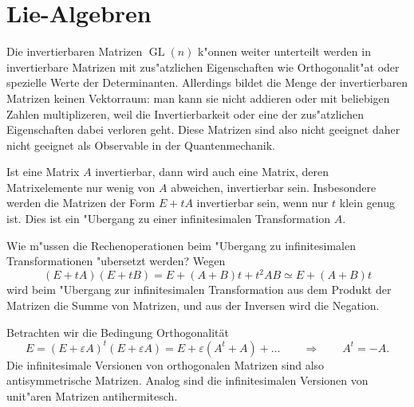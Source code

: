 %
%
\section{Lie-Algebren}
Die invertierbaren Matrizen $\operatorname{GL}(n)$ k"onnen weiter
unterteilt werden in invertierbare Matrizen mit zus"atzlichen
Eigenschaften wie Orthogonalit"at oder spezielle Werte der Determinanten.
Allerdings bildet die Menge der invertierbaren Matrizen keinen
Vektorraum: man kann sie nicht addieren oder mit beliebigen Zahlen
multiplizeren, weil die Invertierbarkeit oder eine der zus"atzlichen
Eigenschaften dabei verloren geht. Diese Matrizen sind also nicht
geeignet daher nicht geeignet als Observable in der Quantenmechanik.

Ist eine Matrix $A$ invertierbar, dann wird auch eine Matrix, deren
Matrixelemente nur wenig von $A$ abweichen, invertierbar sein.
Insbesondere werden die Matrizen der Form $E+tA$ invertierbar sein,
wenn nur $t$ klein genug ist. Dies ist ein "Ubergang zu einer 
infinitesimalen Transformation $A$.

Wie m"ussen die Rechenoperationen beim "Ubergang zu infinitesimalen
Transformationen "ubersetzt werden?
Wegen
\[
(E+tA)(E+tB)=E+(A+B)t + t^2AB\simeq E+(A+B)t
\]
wird beim "Ubergang zur infinitesimalen Transformation aus dem Produkt
der Matrizen die Summe von Matrizen, und aus der Inversen wird die Negation.

Betrachten wir die Bedingung Orthogonalit\"at
\[
E=
(E+\varepsilon A)^t(E+\varepsilon A)
=
E+\varepsilon (A^t+A) + \dots
\qquad
\Rightarrow
\qquad
A^t=-A.
\]
Die infinitesimale Versionen von orthogonalen Matrizen sind also
antisymmetrische Matrizen.
Analog sind die infinitesimalen Versionen von unit"aren Matrizen
antihermitesch.

